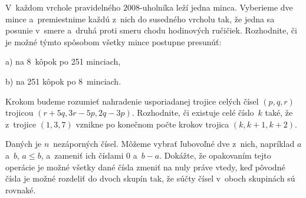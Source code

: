 {V~každom vrchole pravidelného $2008$-uholníka leží jedna minca.
Vyberieme dve mince a~premiestnime každú z~nich do susedného vrcholu
tak, že jedna sa posunie v~smere
a~druhá proti smeru chodu hodinových ručičiek.
Rozhodnite, či je možné týmto spôsobom všetky mince postupne
presunúť:
\item{a)} na 8~kôpok po 251 minciach,
\item{b)} na 251 kôpok po 8~minciach.
\endgraf
\vpravo{[58--A--I--5]}

Krokom budeme rozumieť nahradenie usporiadanej trojice celých čísel $(p,q,r)$ trojicou $(r+5q,3r-5p,2q-3p)$. Rozhodnite, či existuje celé číslo~$k$ také, že z~trojice $(1,3,7)$ vznikne po konečnom počte krokov trojica $(k,k+1,k+2)$.
\vpravo{[52--B--I--4]}

Daných je $n$~nezáporných čísel. Môžeme vybrať ľubovoľné dve z~nich,
napríklad $a$ a~$b$, $a\le b$, a~zameniť ich číslami $0$ a~$b-a$. Dokážte, že opakovaním
tejto operácie je možné všetky dané čísla zmeniť na nuly práve vtedy, keď pôvodné čísla
je možné rozdeliť do dvoch skupín tak, že súčty čísel v~oboch skupinách sú rovnaké.
\vpravo{[51--B--II--4]}
}

